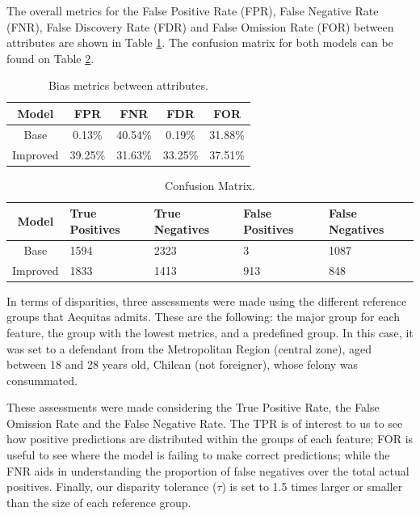 \documentclass[twoside,11pt]{article}
\begin{document}
The overall metrics for the False Positive Rate (FPR), False Negative Rate (FNR), False Discovery Rate (FDR) and False Omission Rate (FOR) between attributes are shown in Table \ref{tab_bias_tdrogas:}. The confusion matrix for both models can be found on Table \ref{tab_cm_tdrogas:}.

\begin{table}[!htb]
\centering
\begin{tabular}{|c|c|c|c|c|}

        \hline
        \textbf{Model} & \textbf{FPR} & \textbf{FNR} & \textbf{FDR} & \textbf{FOR} \\ \hline
        Base & 0.13\% & 40.54\% & 0.19\% & 31.88\%  \\ 
        Improved & 39.25\% & 31.63\% & 33.25\% & 37.51\% \\ 
        
        \hline
    \end{tabular}
\caption{Bias metrics between attributes.}
\label{tab_bias_tdrogas:}
\end{table}

\begin{table}[!htb]
\centering
\begin{tabular}{|c|p{3cm}|p{3cm}|p{3cm}|p{3cm}|}
        \hline
        \textbf{Model} & \textbf{True Positives} & \textbf{True Negatives} & \textbf{False Positives} & \textbf{False Negatives}\\ \hline
        Base & 1594 & 2323 & 3 & 1087  \\ 
        Improved & 1833 & 1413 & 913 & 848  \\ 
        \hline
    \end{tabular}
\caption{Confusion Matrix.}
\label{tab_cm_tdrogas:}
\end{table}

In terms of disparities, three assessments were made using the different reference groups that Aequitas admits. These are the following: the major group for each feature, the group with the lowest metrics, and a predefined group. In this case, it was set to a defendant from the Metropolitan Region (central zone), aged between 18 and 28 years old, Chilean (not foreigner), whose felony was consummated. 

These assessments were made considering the True Positive Rate, the False Omission Rate and the False Negative Rate. The TPR is of interest to us to see how positive predictions are distributed within the groups of each feature; FOR is useful to see where the model is failing to make correct predictions; while the FNR aids in understanding the proportion of false negatives over the total actual positives. Finally, our disparity tolerance ($\tau$) is set to 1.5 times larger or smaller than the size of each reference group. 
\end{document}

